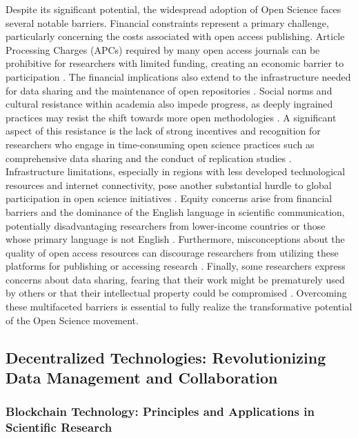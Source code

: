\documentclass{article}
\begin{document}
Despite its significant potential, the widespread adoption of Open Science faces several notable barriers. Financial constraints represent a primary challenge, particularly concerning the costs associated with open access publishing. Article Processing Charges (APCs) required by many open access journals can be prohibitive for researchers with limited funding, creating an economic barrier to participation \cite{tennant2016future}. The financial implications also extend to the infrastructure needed for data sharing and the maintenance of open repositories \cite{boulton2012open}. Social norms and cultural resistance within academia also impede progress, as deeply ingrained practices may resist the shift towards more open methodologies \cite{ioannidis2005most}. A significant aspect of this resistance is the lack of strong incentives and recognition for researchers who engage in time-consuming open science practices such as comprehensive data sharing and the conduct of replication studies \cite{ioannidis2005most}. Infrastructure limitations, especially in regions with less developed technological resources and internet connectivity, pose another substantial hurdle to global participation in open science initiatives \cite{wilkinson2016fair}. Equity concerns arise from financial barriers and the dominance of the English language in scientific communication, potentially disadvantaging researchers from lower-income countries or those whose primary language is not English \cite{chan2011open}. Furthermore, misconceptions about the quality of open access resources can discourage researchers from utilizing these platforms for publishing or accessing research \cite{tennant2016future}. Finally, some researchers express concerns about data sharing, fearing that their work might be prematurely used by others or that their intellectual property could be compromised \cite{vuorikari2016open}. Overcoming these multifaceted barriers is essential to fully realize the transformative potential of the Open Science movement.

\subsection{Decentralized Technologies: Revolutionizing Data Management and Collaboration}

\subsubsection{Blockchain Technology: Principles and Applications in Scientific Research}
\end{document}
